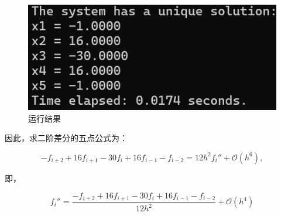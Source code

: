 \begin{figure}[H]
    \centering
    \includegraphics[width=1.0\textwidth]{Problem_1/figs/coeff.png}
    \caption{运行结果}
\end{figure}
因此，求二阶差分的五点公式为：

\[
- f_{i+2} + 16 f_{i+1} - 30 f_i + 16 f_{i-1} - f_{i-2} = 12 h^2 f_i'' + \mathcal{O}(h^6),
\]

即，

\[
\boxed{ f_i'' = \frac{ -f_{i+2} + 16 f_{i+1} - 30 f_i + 16 f_{i-1} - f_{i-2} }{12 h^2} + \mathcal{O}(h^4) }
\]



